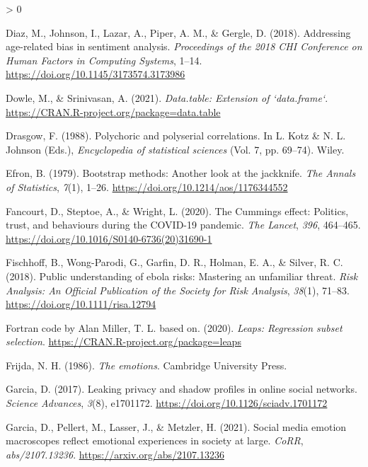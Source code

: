 \documentclass[
  english,
  jou,floatsintext]{apa7}
\newlength{\cslhangindent}
\newenvironment{CSLReferences}[2] %
 {%
  \setlength{\parindent}{0pt}
  \ifodd #1 \everypar{\setlength{\hangindent}{\cslhangindent}}\ignorespaces\fi
  \ifnum #2 > 0
  \setlength{\parskip}{#2\baselineskip}
  \fi
 }%
 {}
\begin{document}
\begin{CSLReferences}{1}{0}
\leavevmode\hypertarget{ref-Diaz2018}{}%
Diaz, M., Johnson, I., Lazar, A., Piper, A. M., \& Gergle, D. (2018). Addressing age-related bias in sentiment analysis. \emph{Proceedings of the 2018 CHI Conference on Human Factors in Computing Systems}, 1--14. \url{https://doi.org/10.1145/3173574.3173986}

\leavevmode\hypertarget{ref-R-data.table}{}%
Dowle, M., \& Srinivasan, A. (2021). \emph{Data.table: Extension of `data.frame`}. \url{https://CRAN.R-project.org/package=data.table}

\leavevmode\hypertarget{ref-Drasgow1988}{}%
Drasgow, F. (1988). Polychoric and polyserial correlations. In L. Kotz \& N. L. Johnson (Eds.), \emph{Encyclopedia of statistical sciences} (Vol. 7, pp. 69--74). Wiley.

\leavevmode\hypertarget{ref-Efron1979}{}%
Efron, B. (1979). Bootstrap methods: Another look at the jackknife. \emph{The Annals of Statistics}, \emph{7}(1), 1--26. \url{https://doi.org/10.1214/aos/1176344552}

\leavevmode\hypertarget{ref-Fancourt2020}{}%
Fancourt, D., Steptoe, A., \& Wright, L. (2020). The {Cummings} effect: Politics, trust, and behaviours during the {COVID-19} pandemic. \emph{The Lancet}, \emph{396}, 464--465. \url{https://doi.org/10.1016/S0140-6736(20)31690-1}

\leavevmode\hypertarget{ref-fischhoff2018}{}%
Fischhoff, B., Wong-Parodi, G., Garfin, D. R., Holman, E. A., \& Silver, R. C. (2018). Public understanding of ebola risks: Mastering an unfamiliar threat. \emph{Risk Analysis: An Official Publication of the Society for Risk Analysis}, \emph{38}(1), 71--83. \url{https://doi.org/10.1111/risa.12794}

\leavevmode\hypertarget{ref-R-leaps}{}%
Fortran code by Alan Miller, T. L. based on. (2020). \emph{Leaps: Regression subset selection}. \url{https://CRAN.R-project.org/package=leaps}

\leavevmode\hypertarget{ref-frijda1986}{}%
Frijda, N. H. (1986). \emph{The emotions}. Cambridge University Press.

\leavevmode\hypertarget{ref-Garcia2017}{}%
Garcia, D. (2017). Leaking privacy and shadow profiles in online social networks. \emph{Science Advances}, \emph{3}(8), e1701172. \url{https://doi.org/10.1126/sciadv.1701172}

\leavevmode\hypertarget{ref-Garcia2021}{}%
Garcia, D., Pellert, M., Lasser, J., \& Metzler, H. (2021). Social media emotion macroscopes reflect emotional experiences in society at large. \emph{CoRR}, \emph{abs/2107.13236}. \url{https://arxiv.org/abs/2107.13236}


\end{CSLReferences}
\end{document}
